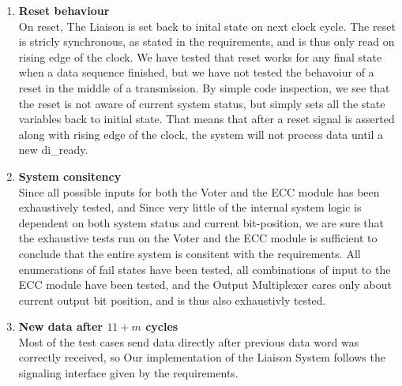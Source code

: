 \begin{enumerate}
\item{\textbf{Reset behaviour}} \hfill\\
    On reset, The Liaison is set back to inital state on next clock cycle. The reset is stricly synchronous,
    as stated in the requirements\cite{task}, and is thus only read on rising edge of the clock. We have
    tested that reset works for any final state when a data sequence finished, but we have not tested the
    behavoiur of a reset in the middle of a transmission. By simple code inspection, we see that the
    reset is not aware of current system status, but simply sets all the state variables back to initial
    state. That means that after a reset signal is asserted along with rising edge of the clock, the system
    will not process data until a new {\ttfamily di\_ready}.

\item{\textbf{System consitency}} \hfill\\
    Since all possible inputs for both the Voter and the ECC module has been exhaustively tested, and 
    Since very little of the internal system logic is dependent on both system status and current bit-position,
    we are sure that the exhaustive tests run on the Voter and the ECC module is sufficient to conclude that 
    the entire system is consitent with the requirements. All enumerations of fail states have been tested, all combinations
    of input to the ECC module have been tested, and the Output Multiplexer cares only about current output bit position,
    and is thus also exhaustivly tested.

\item{\textbf{New data after $11+m$ cycles}} \hfill\\
    Most of the test cases send data directly after previous data word was correctly received, so 
    Our implementation of the Liaison System follows the signaling interface given by the requirements.

\end{enumerate}
